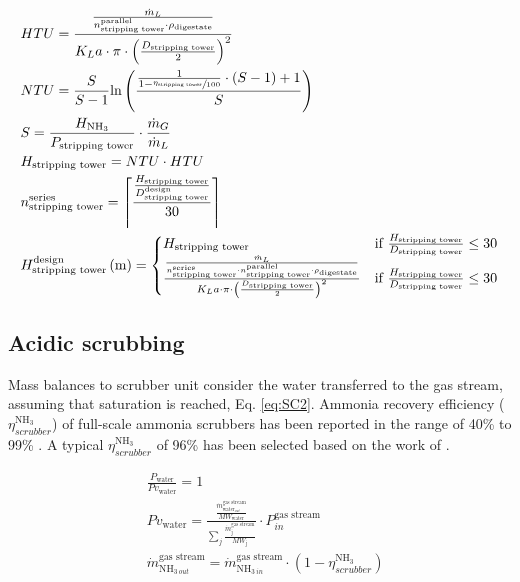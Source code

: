 \begin{refsection}[referencesApD]
\begin{align}
& HTU = \frac{\frac{\dot{m}_L}{n_{\text{stripping tower}}^{\text{parallel}} \cdot\rho_{\text{digestate}}}}{K_{L}a \cdot \pi \cdot \left(\frac{D_{\text{stripping tower}}}{2}\right)^2} \label{eq:HTUStripping} \\
& NTU = \frac{S}{S-1} \text{ln}\left(\frac{\frac{1}{1-\sfrac{\eta_{\text{stripping tower}}}{100}} \cdot \left(S-1\right) + 1}{S}\right) \label{eq:NTUStripping} \\
& S = \frac{H_{\text{NH}_3}}{P_{\text{stripping tower}}} \cdot \frac{\dot{m}_G}{\dot{m}_L} \\
& H_{\text{stripping tower}} = NTU \cdot HTU \label{eq:HStripping} \\
& n_{\text{stripping tower}}^{\text{series}} = \ceil*{\frac{\frac{H_{\text{stripping tower}}}{ D_{\text{stripping tower}}^{\text{design}}}}{30}}\label{eq:nStrippersSerie}\\
& H_{\text{stripping tower}}^{\text{design}} \left(\text{m}\right) =
\begin{cases}
H_{\text{stripping tower}} & \text{if } 	\frac{H_{\text{stripping tower}}}{D_{\text{stripping tower}}} \leq 30  
\\
\frac{\frac{\dot{m}_L}{n_{\text{stripping tower}}^{\text{series}} \cdot n_{\text{stripping tower}}^{\text{parallel}} \cdot\rho_{\text{digestate}}}}{K_{L}a \cdot \pi \cdot \left(\frac{D_{\text{stripping tower}}}{2}\right)^2} & \text{if } 	\frac{H_{\text{stripping tower}}}{D_{\text{stripping tower}}} \leq 30  
\end{cases} \label{eq:Stripping2Ddesign}
\end{align}

\subsection{Acidic scrubbing}\label{section:AcidicScrubbingNRecoveryPaper}
Mass balances to scrubber unit consider the water transferred to the gas stream, assuming that saturation is reached, Eq. \ref{eq:SC2}. Ammonia  recovery efficiency ($\eta_{scrubber}^{\text{NH}_3}$) of full-scale ammonia scrubbers has been reported in the range of 40\% to 99\% \citep{melse2005air}. A typical $\eta_{scrubber}^{\text{NH}_3}$ of 96\% has been selected based on the work of \citet{melse2005air}.

\begin{align}
& \frac{P_{\text{water}}}{Pv_{\text{water}}} = 1 \label{eq:SC1} 
\\
& Pv_{\text{water}} = \frac{\frac{\dot{m}_{\text{water}_{out}}^{\text{gas stream}}}{MW_\text{water}}}
{\sum_{j}\frac{\dot{m}_{\text{j}}^{\text{gas stream}}}{MW_\text{j}}}
\cdot P_{in}^{\text{gas stream}} \label{eq:SC2} 
\\
& \dot{m}_{\text{NH}_{3 \ out}}^{\text{gas stream}} = \dot{m}_{\text{NH}_{3 \ in}}^{\text{gas stream}} \cdot \left(1-\eta_{scrubber}^{\text{NH}_3}\right) \label{eq:SC3}
\end{align}


\end{refsection}
